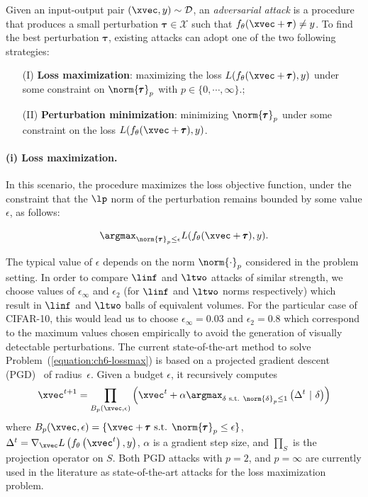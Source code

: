 Given an input-output pair $(\xvec, y) \sim \mathcal{D}$, an \emph{adversarial attack} is a procedure that produces a small perturbation $\pmb{\tau} \in  \mathcal X$  such that $f_\theta(\xvec + \pmb{\tau}) \neq y$.
To find the best perturbation $\pmb{\tau}$, existing attacks can adopt one of the two following strategies:
\begin{itemize}
  \item[(I)] \textbf{Loss maximization}: maximizing the loss $L(f_\theta(\xvec + \pmb{\tau}), y)$ under some constraint on $\norm{\pmb{\tau}}_p$ with $p \in \{0, \cdots, \infty\}$.;
  \item[(II)] \textbf{Perturbation minimization}: minimizing $\norm{\pmb{\tau}}_p$ under some constraint on the loss $L(f_\theta(\xvec + \pmb{\tau}), y)$.
\end{itemize}

\paragraph{(i) Loss maximization.}
In this scenario, the procedure maximizes the loss objective function, under the constraint that the $\lp$ norm of the perturbation remains bounded by some value $\epsilon$, as follows:  

\begin{equation}
  \argmax_{\norm{\pmb{\tau}}_p \leq \epsilon} L(f_\theta(\xvec + \pmb{\tau}),y).
  \label{equation:ch6-lossmax}
\end{equation}

The typical value of $\epsilon$ depends on the norm $\norm{\cdot}_p$ considered in the problem setting.
In order to compare $\linf$ and $\ltwo$ attacks of similar strength, we choose values of $\epsilon_\infty$ and $\epsilon_2$ (for $\linf$ and $\ltwo$ norms respectively) which result in $\linf$ and $\ltwo$ balls of equivalent volumes.
For the particular case of CIFAR-10, this would lead us to choose $\epsilon_\infty = 0.03$ and $\epsilon_2 = 0.8$ which correspond to the maximum values chosen empirically to avoid the generation of visually detectable perturbations. 
The current state-of-the-art method to solve Problem~(\ref{equation:ch6-lossmax}) is based on a projected gradient descent (PGD)~\cite{madry2018towards} of radius~$\epsilon$. Given a budget $\epsilon$, it recursively computes
\begin{equation}
    \xvec^{t+1}=\prod_{B_p(\xvec,\epsilon)}\left(\xvec^t
    +\alpha \argmax_{\delta \text{ s.t. } \norm{\delta}_p \leq 1} \left( \Delta^t \ |\ \delta \right)\right)
    \label{equation:ch6-projectionPGD}
\end{equation}
where $B_p(\xvec,\epsilon) = \{ \xvec + \pmb{\tau} \text{ s.t. } \norm{\pmb{\tau}}_p \leq \epsilon\}$, $\Delta^t = \nabla_\xvec L\left( f_\theta \left(\xvec^t \right), y \right)$, $\alpha$ is a gradient step size, and $\prod_S$ is the projection operator on $S$. Both PGD attacks with $p=2$, and $p=\infty$ are currently used in the literature as state-of-the-art attacks for the loss maximization problem. 


